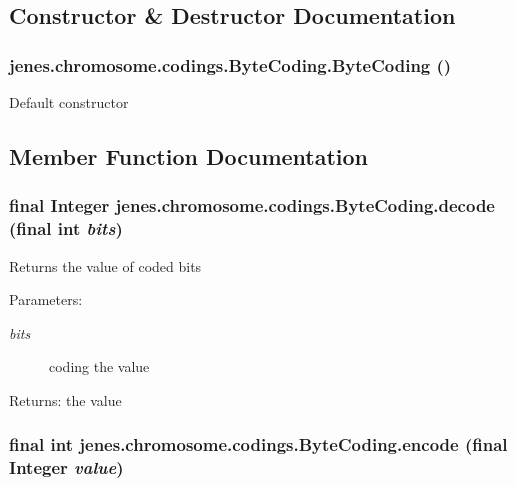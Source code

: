 \subsection{Constructor \& Destructor Documentation}
\hypertarget{classjenes_1_1chromosome_1_1codings_1_1_byte_coding_e5e1d99eebeb9d81d5185808e319dc8a}{
\subsubsection[ByteCoding]{\setlength{\rightskip}{0pt plus 5cm}jenes.chromosome.codings.ByteCoding.ByteCoding ()}}
\label{classjenes_1_1chromosome_1_1codings_1_1_byte_coding_e5e1d99eebeb9d81d5185808e319dc8a}


Default constructor 

\subsection{Member Function Documentation}
\hypertarget{classjenes_1_1chromosome_1_1codings_1_1_byte_coding_9cc6cb469c2fd907f50d9604fe6cb0fa}{
\subsubsection[decode]{\setlength{\rightskip}{0pt plus 5cm}final Integer jenes.chromosome.codings.ByteCoding.decode (final int {\em bits})}}
\label{classjenes_1_1chromosome_1_1codings_1_1_byte_coding_9cc6cb469c2fd907f50d9604fe6cb0fa}


Returns the value of coded bits

\begin{Desc}
\item[Parameters:]
\begin{description}
\item[{\em bits}]coding the value \end{description}
\end{Desc}
\begin{Desc}
\item[Returns:]the value \end{Desc}
\hypertarget{classjenes_1_1chromosome_1_1codings_1_1_byte_coding_1b6e6c0f7996c3d497b257c7417cc28d}{
\subsubsection[encode]{\setlength{\rightskip}{0pt plus 5cm}final int jenes.chromosome.codings.ByteCoding.encode (final Integer {\em value})}}
\label{classjenes_1_1chromosome_1_1codings_1_1_byte_coding_1b6e6c0f7996c3d497b257c7417cc28d}


